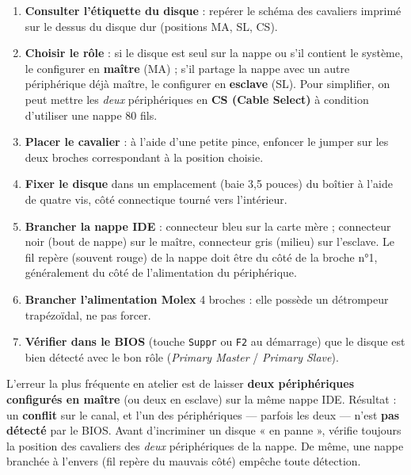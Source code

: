 \documentclass[11pt]{article}
\begin{document}
\begin{methode}
\begin{enumerate}
\item \textbf{Consulter l'étiquette du disque} : repérer le schéma des cavaliers imprimé sur le dessus du disque dur (positions MA, SL, CS).
\item \textbf{Choisir le rôle} : si le disque est seul sur la nappe ou s'il contient le système, le configurer en \textbf{maître} (MA) ; s'il partage la nappe avec un autre périphérique déjà maître, le configurer en \textbf{esclave} (SL). Pour simplifier, on peut mettre les \emph{deux} périphériques en \textbf{CS (Cable Select)} à condition d'utiliser une nappe 80 fils.
\item \textbf{Placer le cavalier} : à l'aide d'une petite pince, enfoncer le jumper sur les deux broches correspondant à la position choisie.
\item \textbf{Fixer le disque} dans un emplacement (baie 3,5 pouces) du boîtier à l'aide de quatre vis, côté connectique tourné vers l'intérieur.
\item \textbf{Brancher la nappe IDE} : connecteur bleu sur la carte mère ; connecteur noir (bout de nappe) sur le maître, connecteur gris (milieu) sur l'esclave. Le fil repère (souvent rouge) de la nappe doit être du côté de la broche n°1, généralement du côté de l'alimentation du périphérique.
\item \textbf{Brancher l'alimentation Molex} 4 broches : elle possède un détrompeur trapézoïdal, ne pas forcer.
\item \textbf{Vérifier dans le BIOS} (touche \texttt{Suppr} ou \texttt{F2} au démarrage) que le disque est bien détecté avec le bon rôle (\emph{Primary Master} / \emph{Primary Slave}).
\end{enumerate}
\end{methode}

\begin{attention}
L'erreur la plus fréquente en atelier est de laisser \textbf{deux périphériques configurés en maître} (ou deux en esclave) sur la même nappe IDE. Résultat : un \textbf{conflit} sur le canal, et l'un des périphériques — parfois les deux — n'est \textbf{pas détecté} par le BIOS. Avant d'incriminer un disque « en panne », vérifie toujours la position des cavaliers des \emph{deux} périphériques de la nappe. De même, une nappe branchée à l'envers (fil repère du mauvais côté) empêche toute détection.
\end{attention}
\end{document}

